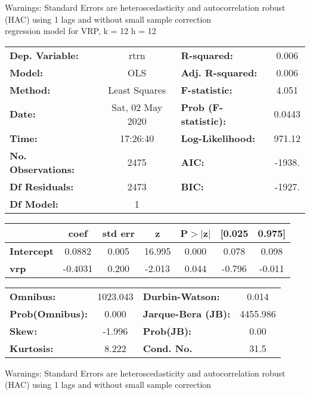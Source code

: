 Warnings: \newline
 [1] Standard Errors are heteroscedasticity and autocorrelation robust (HAC) using 1 lags and without small sample correction\\ 

regression model for VRP, k = 12 h = 12\begin{center}
\begin{tabular}{lclc}
\toprule
\textbf{Dep. Variable:}    &       rtrn       & \textbf{  R-squared:         } &     0.006   \\
\textbf{Model:}            &       OLS        & \textbf{  Adj. R-squared:    } &     0.006   \\
\textbf{Method:}           &  Least Squares   & \textbf{  F-statistic:       } &     4.051   \\
\textbf{Date:}             & Sat, 02 May 2020 & \textbf{  Prob (F-statistic):} &   0.0443    \\
\textbf{Time:}             &     17:26:40     & \textbf{  Log-Likelihood:    } &    971.12   \\
\textbf{No. Observations:} &        2475      & \textbf{  AIC:               } &    -1938.   \\
\textbf{Df Residuals:}     &        2473      & \textbf{  BIC:               } &    -1927.   \\
\textbf{Df Model:}         &           1      & \textbf{                     } &             \\
\bottomrule
\end{tabular}
\begin{tabular}{lcccccc}
                   & \textbf{coef} & \textbf{std err} & \textbf{z} & \textbf{P$> |$z$|$} & \textbf{[0.025} & \textbf{0.975]}  \\
\midrule
\textbf{Intercept} &       0.0882  &        0.005     &    16.995  &         0.000        &        0.078    &        0.098     \\
\textbf{vrp}       &      -0.4031  &        0.200     &    -2.013  &         0.044        &       -0.796    &       -0.011     \\
\bottomrule
\end{tabular}
\begin{tabular}{lclc}
\textbf{Omnibus:}       & 1023.043 & \textbf{  Durbin-Watson:     } &    0.014  \\
\textbf{Prob(Omnibus):} &   0.000  & \textbf{  Jarque-Bera (JB):  } & 4455.986  \\
\textbf{Skew:}          &  -1.996  & \textbf{  Prob(JB):          } &     0.00  \\
\textbf{Kurtosis:}      &   8.222  & \textbf{  Cond. No.          } &     31.5  \\
\bottomrule
\end{tabular}
\end{center}

Warnings: \newline
 [1] Standard Errors are heteroscedasticity and autocorrelation robust (HAC) using 1 lags and without small sample correction\\ 

